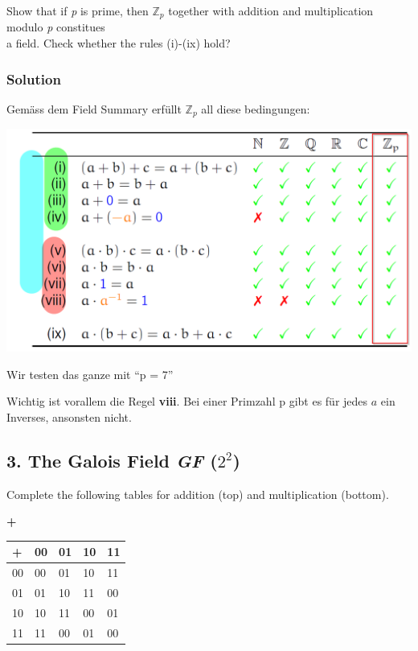 \documentclass[11pt]{article}
\begin{document}
Show that if \emph{p} is prime, then \(\mathbb{Z}_{p}\) together with
addition and multiplication modulo \emph{p} constitues\\
a field. Check whether the rules (i)-(ix) hold?

\hypertarget{solution}{%
\subsubsection{Solution}\label{solution}}

Gemäss dem Field Summary erfüllt \(\mathbb{Z}_{p}\) all diese
bedingungen:

\includegraphics[scale=0.80]{img/fieldsum.png}

Wir testen das ganze mit ``p = 7''

Wichtig ist vorallem die Regel \textbf{viii}. Bei einer Primzahl p gibt
es für jedes \(a\) ein Inverses, ansonsten nicht.

    \hypertarget{the-galois-field-gf-22}{%
\subsection{\texorpdfstring{3. The Galois Field \emph{GF}
(\(2^{2}\))}{3: The Galois Field GF (2\^{}\{2\})}}\label{the-galois-field-gf-22}}

Complete the following tables for addition (top) and multiplication
(bottom).

\textbf{+}

\begin{longtable}[]{@{}lllll@{}}
\toprule
+ & 00 & 01 & 10 & 11\tabularnewline
\midrule
\endhead
00 & 00 & 01 & 10 & 11\tabularnewline
01 & 01 & 10 & 11 & 00\tabularnewline
10 & 10 & 11 & 00 & 01\tabularnewline
11 & 11 & 00 & 01 & 00\tabularnewline
\bottomrule
\end{longtable}
\end{document}
